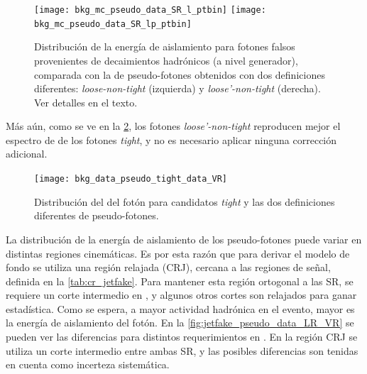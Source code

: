 \begin{figure}[!h]
  \centering

  \texttt{[image: bkg\_mc\_pseudo\_data\_SR\_l\_ptbin]}
  \texttt{[image: bkg\_mc\_pseudo\_data\_SR\_lp\_ptbin]}

  \caption{Distribución de la energía de aislamiento para fotones falsos
    provenientes de decaimientos hadrónicos (a nivel generador), comparada con
    la de pseudo-fotones obtenidos con dos definiciones diferentes: \emph{loose-non-tight} (izquierda)
    y \emph{loose'-non-tight} (derecha). Ver detalles en el texto.}
  \label{fig:jetfake_mc_data}

\end{figure}

Más aún, como se ve en la \cref{fig:jetfake_pseudo_data_pt}, los fotones \emph{loose'-non-tight}
reproducen mejor el espectro de {\pt} de los fotones \emph{tight}, y no es necesario
aplicar ninguna corrección adicional.

\begin{figure}[!h]
  \centering

  \texttt{[image: bkg\_data\_pseudo\_tight\_data\_VR]}

  \caption{Distribución del {\pt} del fotón para candidatos
    \emph{tight} y las dos definiciones diferentes de pseudo-fotones.}
  \label{fig:jetfake_pseudo_data_pt}

\end{figure}


La distribución de la energía de aislamiento de los pseudo-fotones puede variar
en distintas regiones cinemáticas. Es por esta razón que para derivar el modelo
de fondo se utiliza una región relajada (CRJ), cercana a las regiones de señal, definida en
la \cref{tab:cr_jetfake}. Para mantener esta región ortogonal a las SR, se
requiere un corte intermedio en {\met}, y algunos otros cortes son relajados
para ganar estadística. Como se espera, a mayor actividad hadrónica en el
evento, mayor es la energía de aislamiento del fotón. En la
\cref{fig:jetfake_pseudo_data_LR_VR} se pueden ver las diferencias para distintos
requerimientos en {\HT}. En la región CRJ se utiliza un corte intermedio entre
ambas SR, y las posibles diferencias son tenidas en cuenta como incerteza
sistemática.



